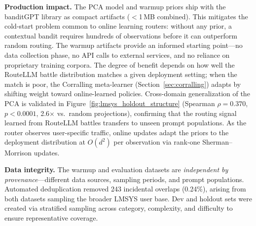\begin{table}[t]
\textbf{Production impact.}
The PCA model and warmup priors ship with the banditGPT library as compact artifacts ($<$1\,MB combined).
This mitigates the cold-start problem common to online learning routers: without any prior, a contextual bandit requires hundreds of observations before it can outperform random routing.
The warmup artifacts provide an informed starting point---no data collection phase, no API calls to external services, and no reliance on proprietary training corpora.
The degree of benefit depends on how well the RouteLLM battle distribution matches a given deployment setting; when the match is poor, the Corralling meta-learner (Section~\ref{sec:corralling}) adapts by shifting weight toward online-learned policies.
Cross-domain generalization of the PCA is validated in Figure~\ref{fig:lmsys_holdout_structure} (Spearman $\rho = 0.370$, $p < 0.0001$, 2.6$\times$ vs.\ random projections), confirming that the routing signal learned from RouteLLM battles transfers to unseen prompt populations.
As the router observes user-specific traffic, online updates adapt the priors to the deployment distribution at $O(d^2)$ per observation via rank-one Sherman--Morrison updates.

\textbf{Data integrity.}
The warmup and evaluation datasets are \emph{independent by provenance}---different data sources, sampling periods, and prompt populations.
Automated deduplication removed 243 incidental overlaps (0.24\%), arising from both datasets sampling the broader LMSYS user base.
Dev and holdout sets were created via stratified sampling across category, complexity, and difficulty to ensure representative coverage.

\end{table}
